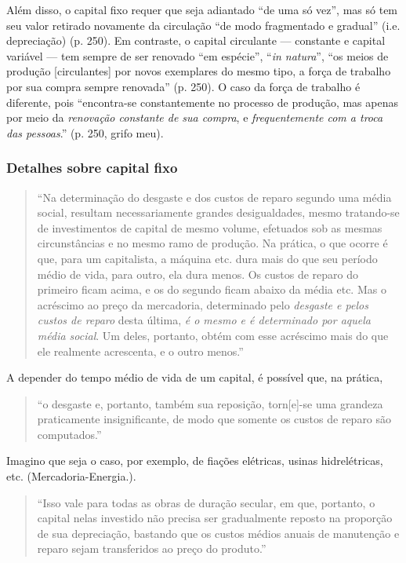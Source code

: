 Além disso, o capital fixo requer que seja adiantado ``de uma só vez'', mas só tem seu valor retirado novamente da circulação ``de modo fragmentado e gradual'' (i.e. depreciação) (p. 250). Em contraste, o capital circulante — constante e capital variável — tem sempre de ser renovado ``em espécie'', ``\textit{in natura}'', ``os meios de produção [circulantes] por novos exemplares do mesmo tipo, a força de trabalho por sua compra sempre renovada'' (p. 250). O caso da força de trabalho é diferente, pois ``encontra-se constantemente no processo de produção, mas apenas por meio da \textit{renovação constante de sua compra}, e \textit{frequentemente com a troca das pessoas}.'' (p. 250, grifo meu).

\subsubsection{Detalhes sobre capital fixo}
\begin{quote}
``Na determinação do desgaste e dos custos de reparo segundo uma média social, resultam necessariamente grandes desigualdades, mesmo tratando-se de investimentos de capital de mesmo volume, efetuados sob as mesmas circunstâncias e no mesmo ramo de produção. Na prática, o que ocorre é que, para um capitalista, a máquina etc. dura mais do que seu período médio de vida, para outro, ela dura menos. Os custos de reparo do primeiro ficam acima, e os do segundo ficam abaixo da média etc. Mas o acréscimo ao preço da mercadoria, determinado pelo \textit{desgaste e pelos custos de reparo} desta última, \textit{é o mesmo e é determinado por aquela média social}. Um deles, portanto, obtém com esse acréscimo mais do que ele realmente acrescenta, e o outro menos.'' \parencite[p. 260]{Marx2014}
\end{quote}

A depender do tempo médio de vida de um capital, é possível que, na prática,
\begin{quote}
 ``o desgaste e, portanto, também sua reposição, torn[e]-se uma grandeza praticamente insignificante, de modo que somente os custos de reparo são computados.'' \parencite[p. 263]{Marx2014}
\end{quote}

Imagino que seja o caso, por exemplo, de fiações elétricas, usinas hidrelétricas, etc. (Mercadoria-Energia.).

\begin{quote}
``Isso vale para todas as obras de duração secular, em que, portanto, o capital nelas investido não precisa ser gradualmente reposto na proporção de sua depreciação, bastando que os custos médios anuais de manutenção e reparo sejam transferidos ao preço do produto.'' \parencite[p. 264]{Marx2014}
\end{quote}

